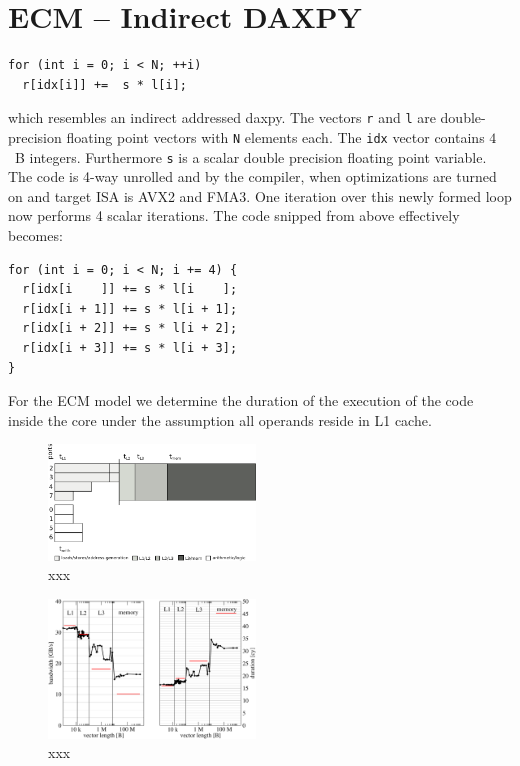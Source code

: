 {\section{ECM -- Indirect DAXPY}

%
\begin{lstlisting}
for (int i = 0; i < N; ++i) 
  r[idx[i]] +=  s * l[i];
\end{lstlisting}
%
which resembles an indirect addressed daxpy.
The vectors \verb'r' and
\verb'l' are double-precision floating point vectors with \verb'N' elements
each. 
The \verb'idx' vector contains $4$~B integers.
Furthermore \verb's' is a scalar double precision floating point variable.
%
The code is 4-way unrolled and by the compiler, when
optimizations are turned on and target ISA is AVX2 and FMA3. One iteration
over this newly formed loop now performs 4 scalar iterations. The code snipped
from above effectively becomes:
%
\begin{lstlisting}
for (int i = 0; i < N; i += 4) {
  r[idx[i    ]] += s * l[i    ];
  r[idx[i + 1]] += s * l[i + 1];
  r[idx[i + 2]] += s * l[i + 2];
  r[idx[i + 3]] += s * l[i + 3];
}
\end{lstlisting}
%
For the ECM model we determine the duration of the execution of the code inside
the core under the assumption all operands reside in L1 cache.

\begin{figure}[tp]
  \centering
  \includegraphics[width=0.49\textwidth,clip=true]{images/ecm-hsw-daxpy-indirect}
  \caption{xxx}
  \label{fig:xxx}
\end{figure}

\begin{figure}[tp]
  \centering
  \includegraphics[width=0.49\textwidth,clip=true]{images/daxpy-indirect-bw-hasep1-f-2.3-w-cy}
  \caption{xxx}
  \label{fig:daxpy-indirect:perf}
\end{figure}

}
